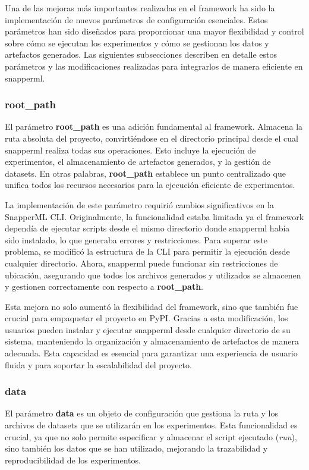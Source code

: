 Una de las mejoras más importantes realizadas en el \gls{framework} ha sido la implementación de nuevos parámetros de configuración esenciales. Estos parámetros han sido diseñados para proporcionar una mayor flexibilidad y control sobre cómo se ejecutan los experimentos y cómo se gestionan los datos y artefactos generados. Las siguientes subsecciones describen en detalle estos parámetros y las modificaciones realizadas para integrarlos de manera eficiente en \Gls{snapperml}.

\subsubsection{root\_path}
El parámetro \textbf{root\_path} es una adición fundamental al \gls{framework}. Almacena la ruta absoluta del proyecto, convirtiéndose en el directorio principal desde el cual \Gls{snapperml} realiza todas sus operaciones. Esto incluye la ejecución de experimentos, el almacenamiento de artefactos generados, y la gestión de datasets. En otras palabras, \textbf{root\_path} establece un punto centralizado que unifica todos los recursos necesarios para la ejecución eficiente de experimentos.

La implementación de este parámetro requirió cambios significativos en la SnapperML CLI. Originalmente, la funcionalidad estaba limitada ya el \gls{framework} dependía de ejecutar scripts desde el mismo directorio donde \Gls{snapperml} había sido instalado, lo que generaba errores y restricciones. Para superar este problema, se modificó la estructura de la CLI para permitir la ejecución desde cualquier directorio. Ahora, \Gls{snapperml} puede funcionar sin restricciones de ubicación, asegurando que todos los archivos generados y utilizados se almacenen y gestionen correctamente con respecto a \textbf{root\_path}.

\vspace{4mm}

Esta mejora no solo aumentó la flexibilidad del \gls{framework}, sino que también fue crucial para empaquetar el proyecto en PyPI. Gracias a esta modificación, los usuarios pueden instalar y ejecutar \Gls{snapperml} desde cualquier directorio de su sistema, manteniendo la organización y almacenamiento de artefactos de manera adecuada. Esta capacidad es esencial para garantizar una experiencia de usuario fluida y para soportar la escalabilidad del proyecto.

\subsubsection{data} El parámetro \textbf{data} es un objeto de configuración que gestiona la ruta y los archivos de datasets que se utilizarán en los experimentos. Esta funcionalidad es crucial, ya que no solo permite especificar y almacenar el script ejecutado (\textit{run}), sino también los datos que se han utilizado, mejorando la trazabilidad y reproducibilidad de los experimentos.

